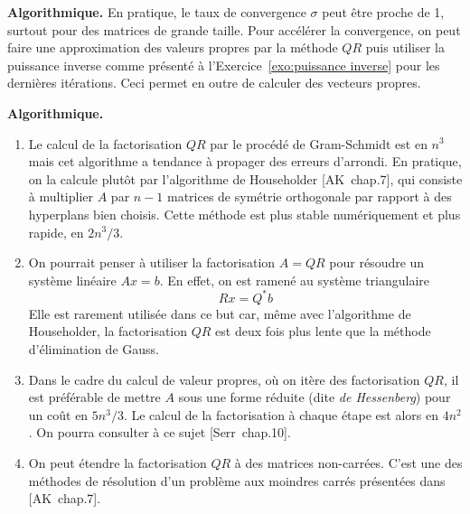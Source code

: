 {\bf Algorithmique.}
En pratique, le taux de convergence $\sigma$ peut être proche de 1, surtout
pour des matrices de grande taille. Pour accélérer la convergence, on peut
faire une approximation des valeurs propres par la méthode $QR$ puis utiliser
la puissance inverse comme présenté à l'Exercice~\ref{exo:puissance inverse}
pour les dernières itérations. Ceci permet en outre de calculer des vecteurs
propres.

{\bf Algorithmique.}
\begin{enumerate}
\item Le calcul de la factorisation $QR$ par le procédé de Gram-Schmidt est
	en $n^3$ mais cet algorithme a tendance à propager des erreurs d'arrondi.
	En pratique, on la calcule plutôt par l'algorithme de Householder
	[AK~chap.7], qui consiste à multiplier $A$ par $n-1$ matrices de symétrie
	orthogonale par rapport à des hyperplans bien choisis. Cette méthode est
	plus stable numériquement et plus rapide, en $2n^3/3$.
\item On pourrait penser à utiliser la factorisation $A = QR$ pour résoudre
	un système linéaire $Ax = b$. En effet, on est ramené au système
	triangulaire
\[
Rx = Q^* b
\]
Elle est rarement utilisée dans ce but car, même avec l'algorithme de
Householder, la factorisation $QR$ est deux fois plus lente que la méthode
d'élimination de Gauss.
\item
	Dans le cadre du calcul de valeur propres, où on itère des
	factorisation $QR$, il est préférable de mettre $A$ sous une forme réduite
	(dite \emph{de Hessenberg}) pour un coût en $5n^3/3$. Le calcul de la
	factorisation à chaque étape est alors en $4n^2$. On pourra consulter à ce
	sujet [Serr~chap.10].
\item On peut étendre la factorisation $QR$ à des matrices non-carrées. C'est
	une des méthodes de résolution d'un problème aux moindres carrés présentées
	dans [AK~chap.7].
\end{enumerate}

%
%
%
%
%
%
%

